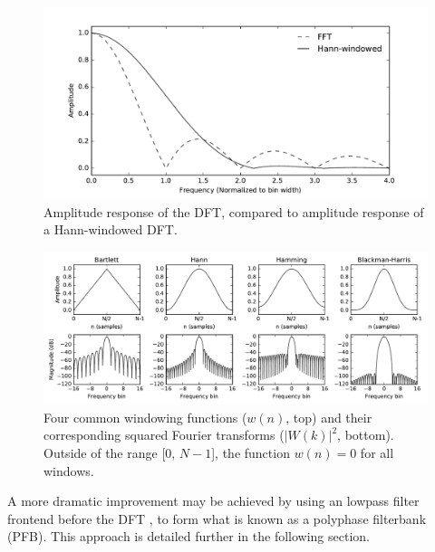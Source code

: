 \documentclass{ws-rv961x669}
\begin{document}
\begin{figure}[t]
 \centering
 \includegraphics[width=\textwidth]{./figures/fft_resp}
 
 \caption{Amplitude response of the DFT, compared to amplitude response of a Hann-windowed DFT. \label{fig:fft_resp}}
\end{figure}

\begin{figure}[t]
 \centering
 \includegraphics[width=\textwidth]{./figures/window_fns}
 \caption{Four common windowing functions ($w(n)$, top) and their corresponding squared Fourier transforms ($|W(k)|^2$, bottom). Outside of the range [0, $N-1$], the function $w(n)=0$ for all windows. \label{fig:window_fns}}
\end{figure}

A more dramatic improvement may be achieved by using an lowpass filter frontend before the DFT \citep{Bellanger:1976p7898}, to form what is known as a polyphase filterbank (PFB). This approach is detailed further in the following section. 

\end{document}
